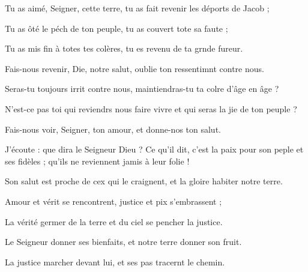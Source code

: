 \item Tu as aimé, Seigner, cette terre,\psstar{} tu as fait revenir les déports de Jacob ;
\item Tu as ôté le péch de ton peuple,\psstar{} tu as couvert tote sa faute ;
\item Tu as mis fin à totes tes colères,\psstar{} tu es revenu de ta grnde fureur.
\item Fais-nous revenir, Die, notre salut,\psstar{} oublie ton ressentimnt contre nous.
\item Seras-tu toujours irrit contre nous,\psstar{} maintiendras-tu ta colre d’âge en âge ?
\item N’est-ce pas toi qui reviendrs nous faire vivre\psstar{} et qui seras la jie de ton peuple ?
\item Fais-nous voir, Seigner, ton amour,\psstar{} et donne-nos ton salut.
\item J’écoute : que dira le Seigneur Dieu ?\pscross{} Ce qu’il dit, c’est la paix pour son peple et ses fidèles ;\psstar{} qu’ils ne reviennent jamis à leur folie !
\item Son salut est proche de cex qui le craignent,\psstar{} et la gloire habiter notre terre.
\item Amour et vérit se rencontrent,\psstar{} justice et pix s’embrassent ;
\item La vérité germer de la terre\psstar{} et du ciel se pencher la justice.
\item Le Seigneur donner ses bienfaits,\psstar{} et notre terre donner son fruit.
\item La justice marcher devant lui,\psstar{} et ses pas tracernt le chemin.